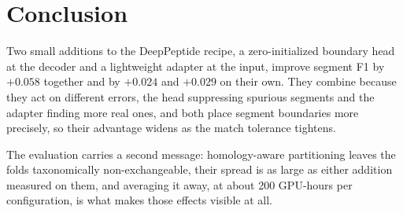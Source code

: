 \documentclass{article}
\begin{document}

\section{Conclusion}
\label{sec:conclusion}

Two small additions to the DeepPeptide recipe, a zero-initialized boundary head at the decoder and a lightweight adapter at the input, improve segment F1 by $+0.058$ together and by $+0.024$ and $+0.029$ on their own. They combine because they act on different errors, the head suppressing spurious segments and the adapter finding more real ones, and both place segment boundaries more precisely, so their advantage widens as the match tolerance tightens.

The evaluation carries a second message: homology-aware partitioning leaves the folds taxonomically non-exchangeable, their spread is as large as either addition measured on them, and averaging it away, at about 200 GPU-hours per configuration, is what makes those effects visible at all.

\end{document}
